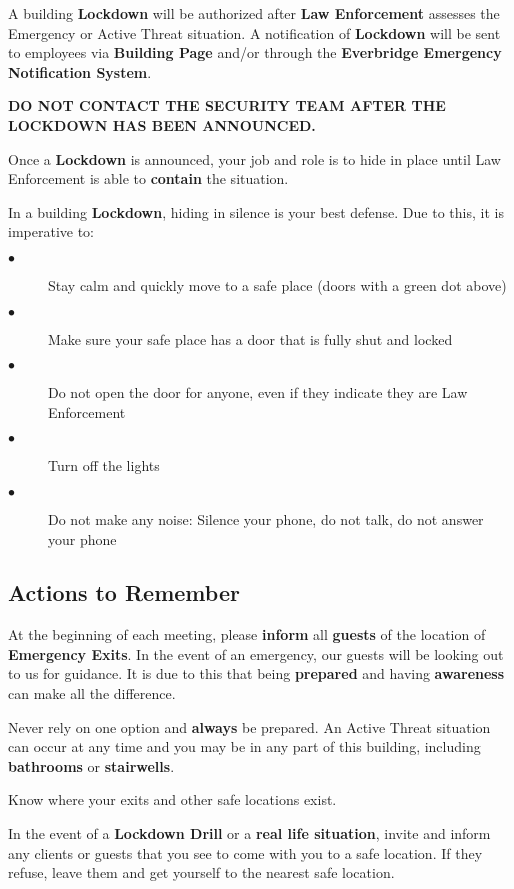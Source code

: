 \documentclass{article}
\begin{document}
A building \textbf{Lockdown} will be authorized after \textbf{Law Enforcement} assesses the Emergency or Active Threat situation. A notification of \textbf{Lockdown} will be sent to employees via \textbf{Building Page} and/or through the \textbf{Everbridge Emergency Notification System}.

\textbf{DO NOT CONTACT THE SECURITY TEAM AFTER THE LOCKDOWN HAS BEEN ANNOUNCED.} 

Once a \textbf{Lockdown} is announced, your job and role is to hide in place until Law Enforcement is able to \textbf{contain} the situation.

In a building \textbf{Lockdown}, hiding in silence is your best defense. Due to this, it is imperative to:

\begin{description}
    \item[$\bullet$] Stay calm and quickly move to a safe place (doors with a green dot above)
    \item[$\bullet$] Make sure your safe place has a door that is fully shut and locked
    \item[$\bullet$] Do not open the door for anyone, even if they indicate they are Law Enforcement
    \item[$\bullet$] Turn off the lights
    \item[$\bullet$] Do not make any noise: Silence your phone, do not talk, do not answer your phone
\end{description}

\subsection{Actions to Remember}
At the beginning of each meeting, please \textbf{inform} all \textbf{guests} of the location of \textbf{Emergency Exits}. In the event of an emergency, our guests will be looking out to us for guidance. It is due to this that being \textbf{prepared} and having \textbf{awareness} can make all the difference.

Never rely on one option and \textbf{always} be prepared. An Active Threat situation can occur at any time and you may be in any part of this building, including \textbf{bathrooms} or \textbf{stairwells}. 

Know where your exits and other safe locations exist.

In the event of a \textbf{Lockdown Drill} or a \textbf{real life situation}, invite and inform any clients or guests that you see to come with you to a safe location. If they refuse, leave them and get yourself to the nearest safe location.
\end{document}
